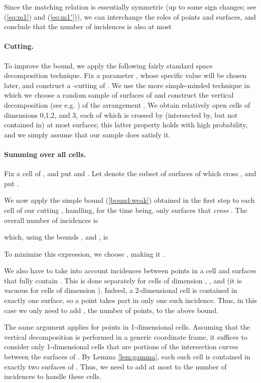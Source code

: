 \documentclass[12pt]{article}
\begin{document}
Since the matching relation is essentially symmetric (up to some
sign changes; see (\ref{eq:m1}) and (\ref{eq:m1'})), we can interchange
the roles of points and surfaces, and conclude that the number of
incidences is also at most


\paragraph{Cutting.}
To improve the bound, we apply the following fairly standard space 
decomposition technique.
Fix a parameter , whose specific value will be chosen later,
and construct a -cutting  of  \cite{Ch05}. 
We use the more simple-minded technique in which we choose a random
sample  of  surfaces of  and construct the
vertical decomposition (see e.g. \cite{SA}) of the arrangement
. We obtain
 relatively open cells of dimensions 0,1,2, and 3, each
of which is crossed by (intersected by, but not contained in) at most
 surfaces; this latter property holds with high
probability, and we simply assume that our sample  does satisfy it.


\paragraph{Summing over all cells.}
Fix a cell  of , and put  and . Let  denote the subset of surfaces of 
which cross , and put .

We now apply the simple bound (\ref{bound:weak}) obtained in the
first step to each cell  of our cutting , handling,
for the time being, only surfaces that {\em cross} . The
overall number of incidences is

which, using the bounds , and , is

To minimize this expression, we choose , making it
.

We also have to take into account incidences between points in a
cell  and surfaces that fully contain . 
This is done separately for cells of dimension , , and  (it
is vacuous for cells of dimension ). Indeed, a 2-dimensional cell
 is contained in exactly one surface, so a point 
takes part in only one such incidence.
Thus, in this case we only need to add , the number of points,
to the above bound.

The same argument applies for points in 1-dimensional cells.
Assuming that the vertical decomposition is performed in a generic
coordinate frame, it suffices to consider only 1-dimensional cells that
are portions of the intersection curves between the surfaces of
. By Lemma \ref{lem:gamma}, each such cell  is contained
in exactly two surfaces of .
Thus, we need to add at most  to the number of incidences to handle
these cells.
\end{document}
